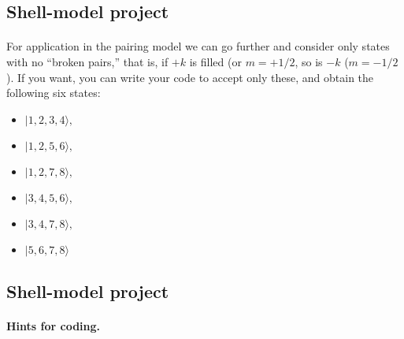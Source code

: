 \subsection*{Shell-model project}

\paragraph{}

For application in the pairing model we can go further and consider only states with 
no ``broken pairs,'' that is, if $+k$ is filled (or $m = +1/2$, so is $-k$ ($m=-1/2$). 
If you want, you can write your code to accept only these, and obtain the following 
six states:

\begin{itemize}
\item $|           1,           2 ,          3         ,       4  \rangle , $

\item $|            1      ,     2        ,        5         ,       6 \rangle , $

\item $|            1         ,       2     ,           7         ,       8  \rangle , $

\item $|            3        ,        4      ,          5          ,      6  \rangle , $

\item $|            3        ,        4      ,          7         ,       8  \rangle , $

\item $|            5        ,        6     ,           7     ,           8  \rangle $
\end{itemize}

\noindent



\subsection*{Shell-model project}

\paragraph{Hints for coding.}

